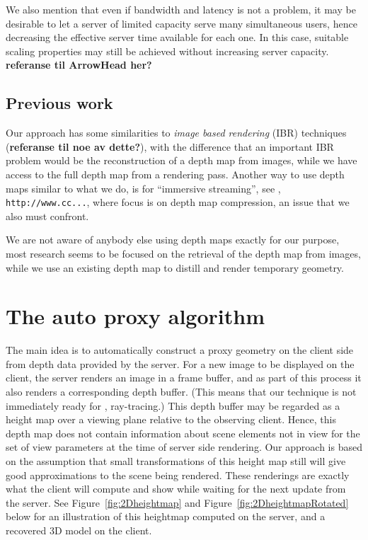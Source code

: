 We also mention that even if bandwidth and latency is not a problem, it may be
desirable to let a server of limited capacity serve many simultaneous users,
hence decreasing the effective server time available for each one. In this case,
suitable scaling properties may still be achieved without increasing server
capacity. \textbf{referanse til ArrowHead her?}

\subsection{Previous work}

Our approach has some similarities to {\em image based rendering} (IBR)
techniques (\textbf{referanse til noe av dette?}), with the difference that an
important IBR problem would be the reconstruction of a depth map from images,
while we have access to the full depth map from a rendering pass.
Another way to use depth maps similar to what we do, is for ``immersive
streaming'',
see \eg, \texttt{http://www.cc...},
where focus is on depth map compression, an issue that we also must confront.

We are not aware of anybody else using depth maps exactly for our purpose, most
research seems to be focused on the retrieval of the depth map from images,
while we use an existing depth map to distill and render temporary geometry.




\section{The auto proxy algorithm}

The main idea is to automatically construct a proxy geometry on the client side
from depth data provided by the server. For a new image to be displayed on the
client, the server renders an image in a frame buffer, and as part of this
process it also renders a corresponding depth buffer. (This means that our
technique is not immediately ready for \eg, ray-tracing.) This depth buffer may
be regarded as a height map over a viewing plane relative to the observing
client. Hence, this depth map does not contain information about scene elements
not in view for the set of view parameters at the time of server side
rendering. Our approach is based on the assumption that small transformations of
this height map still will give good approximations to the scene being
rendered. These renderings are exactly what the client will compute and show
while waiting for the next update from the server. See
Figure~\ref{fig:2Dheightmap} and Figure~\ref{fig:2DheightmapRotated} below for an
illustration of this heightmap computed on the server, and a recovered 3D model
on the client.

